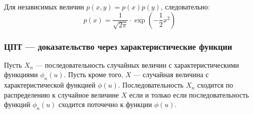 Для независимых величин $p(x,y)=p(x)p(y)$, следовательно:
\begin{equation}
p(x)=\frac{1}{\sqrt{2\pi}}\cdot \exp\left( -\frac{1}{2} x^{2}\right)
\end{equation}



\subsubsection*{ЦПТ --- доказательство через характеристические функции}

\begin{myth}
Пусть $X_{n}$ --- последовательность случайных величин с характеристическими функциями $\phi_{n}(u)$. Пусть кроме того, $X$ --- случайная величина с характеристической функцией $\phi(u)$. Последовательность $X_{n}$ сходится по распределению к случайное величине $X$ если и только если последовательность функций $\phi_{n}(u)$ сходится поточечно к функции $\phi(u)$.
\end{myth}


